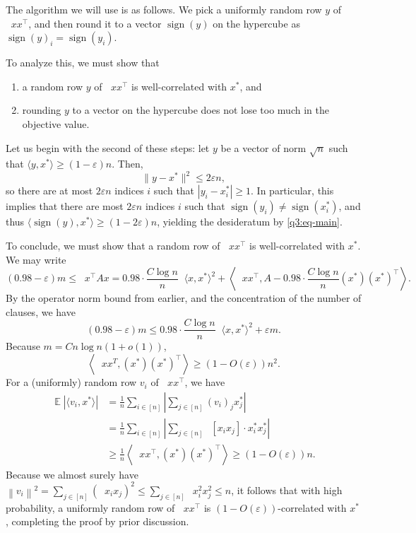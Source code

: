 \documentclass[11pt]{article}
\theoremstyle{definition}
\newcommand{\norm}[1]{\left\| #1 \right\|}
\renewcommand{\epsilon}{\varepsilon}
\newcommand{\eps}{\epsilon}
\DeclareMathOperator{\E}{\mathbb{E}} %
\DeclareMathOperator{\pE}{\widetilde{\mathbb{E}}} %
\newcommand{\sgn}{\operatorname{sign}}
\begin{document}
\begin{enumerate}[label=(\alph*)]
    The algorithm we will use is as follows. We pick a uniformly random row $y$ of $\pE xx^\top$, and then round it to a vector $\sgn(y)$ on the hypercube as $\sgn(y)_i = \sgn(y_i)$.

    To analyze this, we must show that
    \begin{enumerate}
      \item a random row $y$ of $\pE xx^\top$ is well-correlated with $x^*$, and
      \item rounding $y$ to a vector on the hypercube does not lose too much in the objective value.
    \end{enumerate}

    Let us begin with the second of these steps: let $y$ be a vector of norm $\sqrt{n}$ such that $\langle y,x^*\rangle \ge (1-\eps) n$. Then,
    \[ \|y-x^*\|^2 \le 2\eps n, \]
    so there are at most $2\eps n$ indices $i$ such that $|y_i - x_i^*| \ge 1$. In particular, this implies that there are most $2\eps n$ indices $i$ such that $\sgn(y_i) \ne \sgn(x_i^*)$, and thus $\langle \sgn(y) , x^* \rangle \ge (1-2\eps)n$, yielding the desideratum by \eqref{q3:eq-main}. 

    To conclude, we must show that a random row of $\pE xx^\top$ is well-correlated with $x^*$. We may write
    \begin{equation}
      \label{eq:q3-high-corr}
      (0.98-\eps) m \le \pE x^\top A x = 0.98 \cdot \frac{C \log n}{n} \pE \langle x , x^* \rangle^2 + \left\langle \pE xx^\top , A - 0.98 \cdot \frac{C\log n}{n} (x^*)(x^*)^\top \right\rangle.
    \end{equation}
    By the operator norm bound from earlier, and the concentration of the number of clauses, we have
    \[ (0.98 - \eps) m \le 0.98 \cdot \frac{C \log n}{n} \pE \langle x,x^*\rangle^2 + \eps m. \]
    Because $m = C n \log n (1+o(1))$,
    \[ \left\langle \pE xx^T , (x^*)(x^*)^\top \right\rangle \ge (1-O(\eps))n^2. \]
    For a (uniformly) random row $v_i$ of $\pE xx^\top$, we have
    \begin{align*}
      \E |\langle v_i , x^*\rangle| &= \frac{1}{n} \sum_{i \in [n]} \left| \sum_{j \in [n]} (v_i)_j x^*_j \right| \\
        &= \frac{1}{n} \sum_{i \in [n]} \left| \sum_{j \in [n]} \pE [x_i x_j] \cdot x^*_i x^*_j \right| \\
        &\ge \frac{1}{n} \left\langle \pE xx^\top , (x^*)(x^*)^\top \right\rangle \ge (1-O(\eps))n.
    \end{align*}
    Because we almost surely have $\norm{v_i}^2 = \sum_{j \in [n]} \left(\pE x_ix_j\right)^2 \le \sum_{j \in [n]} \pE x_i^2 x_j^2 \le n$, it follows that with high probability, a uniformly random row of $\pE xx^\top$ is $(1-O(\eps))$-correlated with $x^*$, completing the proof by prior discussion.


  \end{enumerate}
\end{document}
